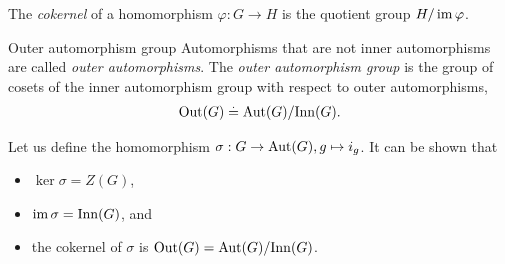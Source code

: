 \begin{defn}[Cokernel]
The \emph{cokernel} of a homomorphism ${\varphi : G \to H}$ is the quotient group $H/\operatorname*{im}{\varphi}$.
\end{defn}

\begin{ex}{Outer automorphism group}{}
Automorphisms that are not inner automorphisms are called \emph{outer automorphisms}. The \emph{outer automorphism group} is the group of cosets of the inner automorphism group with respect to outer automorphisms, \begin{align}
    \mathrm{Out}(G) \overset{.}{=} \mathrm{Aut}(G)/\mathrm{Inn}(G).
\end{align}

Let us define the homomorphism ${\sigma : G \to \mathrm{Aut}(G), g \mapsto i_g}$. It can be shown that \vspace{-10pt}\begin{itemize}
    \item $\ker{\sigma} = Z(G)$,
    \item $\operatorname*{im}{\sigma} = \mathrm{Inn}(G)$, and
    \item the cokernel of $\sigma$ is $\mathrm{Out}(G) = \mathrm{Aut}(G)/\mathrm{Inn}(G)$.
\end{itemize}
\end{ex}
